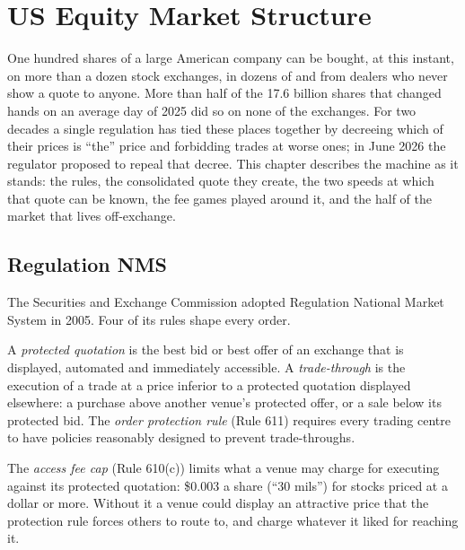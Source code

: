 \chapter{US Equity Market Structure}\label{ch:m1:us-equity-market-structure}

One hundred shares of a large American company can be bought, at this
instant, on more than a dozen stock exchanges, in dozens of  and
from dealers who never show a quote to anyone. More than half of
the 17.6 billion shares that changed hands on an average day of 2025 did so
on none of the exchanges. For two decades a single regulation has tied these
places together by decreeing which of their prices is ``the'' price and
forbidding trades at worse ones; in June 2026 the regulator proposed to
repeal that decree. This chapter describes the machine as it stands: the
rules, the consolidated quote they create, the two speeds at which that quote
can be known, the fee games played around it, and the half of the market that
lives off-exchange.

\section{Regulation NMS}

The Securities and Exchange Commission adopted Regulation National Market
System in 2005. Four of its rules shape every order.

\begin{definition}\label{def:m1:us-equity-market-structure:opr}
A \emph{protected quotation} is the best bid or best offer of an exchange
that is displayed, automated and immediately accessible. A
\emph{trade-through} is the execution of a trade at a
price inferior to a protected quotation displayed elsewhere: a purchase above
another venue's protected offer, or a sale below its protected bid. The
\emph{order protection rule} (Rule 611) requires
every trading centre to have policies reasonably designed to prevent
trade-throughs.
\end{definition}

\begin{definition}\label{def:m1:us-equity-market-structure:cap}
The \emph{access fee cap} (Rule 610(c)) limits what a
venue may charge for executing against its protected quotation: \$0.003 a
share (``30 mils'') for stocks priced at a dollar or more. Without it a venue
could display an attractive price that the protection rule forces others to
route to, and charge whatever it liked for reaching it.
\end{definition}

